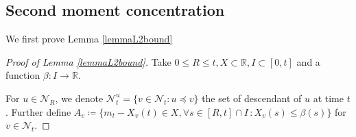 \documentclass{article}
\newcommand{\E}[0]{\mathbb{E}}
\newcommand{\bbone}{\text{\usefont{U}{bbold}{m}{n}1}}
\begin{document}
\subsection{Second moment concentration}\label{subSec:proofprop3}

We first prove Lemma \ref{lemmaL2bound} 

\begin{proof}[Proof of Lemma \ref{lemmaL2bound}]
Take $ 0\leq R\leq t, X \subset \mathbb{R},I \subset [0,t]$ and a function $\beta \colon I \longrightarrow \mathbb{R}$.


For $u\in \mathcal{N}_R$, we denote ${\mathcal{N}}^u_{t}= \{v\in \mathcal{N}_t : u\preceq v\}$ the set of descendant of $u$ at time $t$. Further define  $A_{v}\coloneqq\{ m_t- X_v(t) \in X, \forall s \in [R,t]\cap I \,:  X_v(s)\leq  \beta(s)\}$ for $v\in \mathcal{N}_{t}$.






\end{proof}
\end{document}
